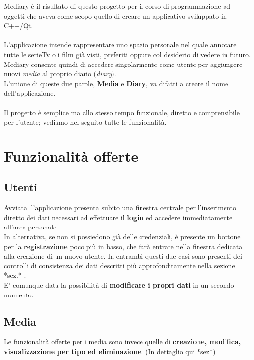 \documentclass[10pt,a4paper,openany]{article}
\begin{document}
Mediary è il risultato di questo progetto per il corso di programmazione ad oggetti che aveva come scopo quello di creare un applicativo sviluppato in C++/Qt.\\\\
L'applicazione intende rappresentare uno spazio personale nel quale annotare tutte le serieTv o i film già visti, preferiti oppure col desiderio di vedere in futuro.\\
Mediary consente quindi di accedere singolarmente come utente per aggiungere nuovi \textit{media} al proprio diario (\textit{diary}).\\
L'unione di queste due parole, \textbf{Media} e \textbf{Diary}, va difatti a creare il nome dell'applicazione.\\\\
Il progetto è semplice ma allo stesso tempo funzionale, diretto e comprensibile per l'utente; vediamo nel seguito tutte le funzionalità.\vspace{20pt}



\section{Funzionalità offerte}
	\subsection{Utenti}

	Avviata, l'applicazione presenta subito una finestra centrale per l'inserimento diretto dei dati necessari ad effettuare il \textbf{login} ed 
	accedere  immediatamente all'area personale.\\
	In alternativa, se non si possiedono già delle credenziali, è presente un bottone per la \textbf{registrazione} poco più in basso, che farà entrare nella 
	finestra dedicata alla creazione di un nuovo utente.
	In entrambi questi due casi sono presenti dei controlli di consistenza dei dati descritti più approfonditamente nella sezione *sez.* .\\
	E' comunque data la possibilità di \textbf{modificare i propri dati} in un secondo momento.
		
	\subsection{Media}
	
	Le funzionalità offerte per i media sono invece quelle di \textbf{creazione, modifica, visualizzazione per tipo ed eliminazione}. (In 
	dettaglio qui *sez*)\vspace{20pt}
	
\end{document}
